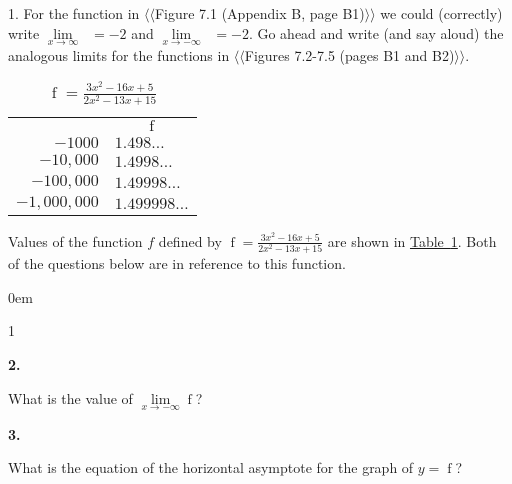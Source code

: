 \documentclass[12pt,]{book}
\theoremstyle{plain}
\theoremstyle{definition}
\numberwithin{equation}{section}
\newcommand{\hrulemedium}{\noalign{\hrule height 0.07em}}
\newcommand{\hrulethick} {\noalign{\hrule height 0.11em}}
\newenvironment{exercisegroup}%
{\medskip\noindent}%
{\par\bigskip}%
\newlength{\exercisegroupindent}%
\newlength{\exercisegroupitemwidth}%
\newenvironment{exercisegrouplist}%
{\vspace{-\partopsep}%
\begin{adjustwidth}{\exercisegroupindent}{0em}}%
{\end{adjustwidth}%
\vspace{-\partopsep}%
\vspace{\baselineskip}}%
\newenvironment{exercisegroupbycol}[1]%
{\begin{exercisegrouplist}%
\vspace{-\multicolsep}%
\begin{multicols}{#1}%
\setlength{\parindent}{0em}%
\setlength{\exercisegroupitemwidth}{\linewidth}}%
{\end{multicols}%
\vspace{-\multicolsep}%
\end{exercisegrouplist}}%
\newenvironment{exercisegroupitem}[1]%
{\begin{minipage}[t]{\exercisegroupitemwidth}
\vspace{0pt}%
{\bfseries#1}%
\rule{0pt}{\baselineskip}}{\strut%
\end{minipage}%
\hspace{\columnsep}}%
\providecommand\phantomsection{}
\newcommand{\fe}[2]{\mathop{{#1}{\left(#2\right)}}}
\begin{document}
\begin{exerciselist}
\item[1.]\phantomsection\hypertarget{exercise-63}{\null}For the function in {$\langle\langle$Figure 7.1 (Appendix B, page B1)$\rangle\rangle$} we could (correctly) write \(\lim\limits_{x\to\infty}\fe{f_1}{x}=-2\) and \(\lim\limits_{x\to-\infty}\fe{f_1}{x}=-2\). Go ahead and write (and say aloud) the analogous limits for the functions in {$\langle\langle$Figures 7.2-7.5 (pages B1 and B2)$\rangle\rangle$}.%
\par\smallskip
\end{exerciselist}
\begin{table}
\centering
\caption{\(\fe{f}{x}=\frac{3x^2-16x+5}{2x^2-13x+15}\)\label{table-limit-at-minus-infinity}}
\begin{tabular}{rl}\hrulethick
\multicolumn{1}{c}{\(x\)}&\multicolumn{1}{c}{\(\fe{f}{x}\)}\\\hrulemedium
\(-1000\)&\(1.498\ldots\)\\
\(-10{,}000\)&\(1.4998\ldots\)\\
\(-100{,}000\)&\(1.49998\ldots\)\\
\(-1{,}000{,}000\)&\(1.499998\ldots\)
\end{tabular}
\end{table}
\begin{exercisegroup}%
Values of the function \(f\) defined by \(\fe{f}{x}=\frac{3x^2-16x+5}{2x^2-13x+15}\) are shown in \hyperref[table-limit-at-minus-infinity]{Table~\ref*{table-limit-at-minus-infinity}}. Both of the questions below are in reference to this function.%
\begin{exercisegroupbycol}{1}%
\begin{exercisegroupitem}{2. }\phantomsection\hypertarget{exercise-64}{\null}
What is the value of \(\lim\limits_{x\to-\infty}\fe{f}{x}\)?%
\end{exercisegroupitem}%
\par%
\begin{exercisegroupitem}{3. }\phantomsection\hypertarget{exercise-65}{\null}
What is the equation of the horizontal asymptote for the graph of \(y=\fe{f}{x}\)?%
\end{exercisegroupitem}%
\par%
\end{exercisegroupbycol}%
\end{exercisegroup}%
\end{document}
